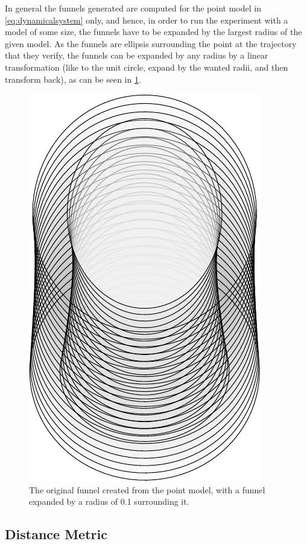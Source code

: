 In general the funnels generated are computed for the point model in
\cref{eq:dynamicalsystem} only, and hence, in order to run the experiment with a
model of some size, the funnels have to be expanded by the largest radius of the
given model. As the funnels are ellipsis surrounding the point at the trajectory
that they verify, the funnels can be expanded by any radius by a linear
transformation (like to the unit circle, expand by the wanted radii, and then
transform back), as can be seen in \cref{fig:expanded-funnel}.


\begin{figure}[!t]
  \centering \includegraphics[scale=.5]{figures/method/expanded-funnel}
  \caption[The expanded experiment funnel]{The original funnel created from the point model, with a funnel
    expanded by a radius of 0.1 surrounding it.}
  \label{fig:expanded-funnel}
\end{figure}

\subsection{Distance Metric}

